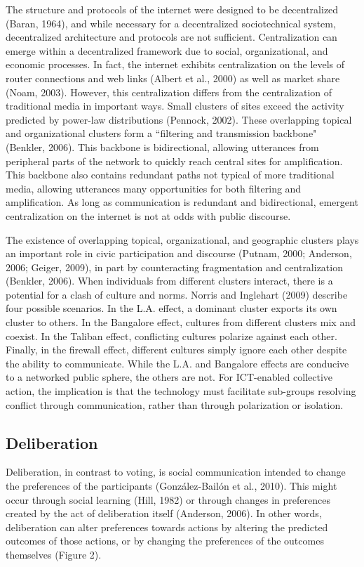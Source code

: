 The structure and protocols of the internet were designed to be decentralized (Baran, 1964), and while necessary for a decentralized sociotechnical system, decentralized architecture and protocols are not sufficient. Centralization can emerge within a decentralized framework due to social, organizational, and economic processes. In fact, the internet exhibits centralization on the levels of router connections and web links (Albert et al., 2000) as well as market share (Noam, 2003). However, this centralization differs from the centralization of traditional media in important ways. Small clusters of sites exceed the activity predicted by power-law distributions (Pennock, 2002). These overlapping topical and organizational clusters form a ``filtering and transmission backbone" (Benkler, 2006). This backbone is bidirectional, allowing utterances from peripheral parts of the network to quickly reach central sites for amplification. This backbone also contains redundant paths not typical of more traditional media, allowing utterances many opportunities for both filtering and amplification. As long as communication is redundant and bidirectional, emergent centralization on the internet is not at odds with public discourse.

The existence of overlapping topical, organizational, and geographic clusters plays an important role in civic participation and discourse (Putnam, 2000; Anderson, 2006; Geiger, 2009), in part by counteracting fragmentation and centralization (Benkler, 2006). When individuals from different clusters interact, there is a potential for a clash of culture and norms. Norris and Inglehart (2009) describe four possible scenarios. In the L.A. effect, a dominant cluster exports its own cluster to others. In the Bangalore effect, cultures from different clusters mix and coexist. In the Taliban effect, conflicting cultures polarize against each other. Finally, in the firewall effect, different cultures simply ignore each other despite the ability to communicate. While the L.A. and Bangalore effects are conducive to a networked public sphere, the others are not. For ICT-enabled collective action, the implication is that the technology must facilitate sub-groups resolving conflict through communication, rather than through polarization or isolation.

\subsection{Deliberation}
Deliberation, in contrast to voting, is social communication intended to change the preferences of the participants (Gonz\'alez-Bail\'on et al., 2010). This might occur through social learning (Hill, 1982) or through changes in preferences created by the act of deliberation itself (Anderson, 2006). In other words, deliberation can alter preferences towards actions by altering the predicted outcomes of those actions, or by changing the preferences of the outcomes themselves (Figure 2).

